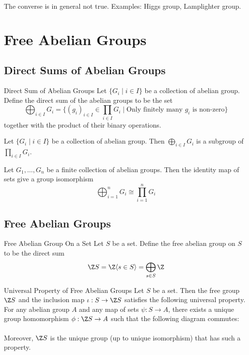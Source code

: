 \documentclass[a4paper]{article}
\begin{document}
The converse is in general not true. Examples: Higgs group, Lamplighter group. 

\pagebreak
\section{Free Abelian Groups}
\subsection{Direct Sums of Abelian Groups}
\begin{defn}{Direct Sum of Abelian Groups}{} Let $\{G_i\;|\;i\in I\}$ be a collection of abelian group. Define the direct sum of the abelian groups to be the set $$\bigoplus_{i\in I}G_i=\{(g_i)_{i\in I}\in\prod_{i\in I}G_i\;|\;\text{Only finitely many }g_i\text{ is non-zero}\}$$ together with the product of their binary operations. 
\end{defn}

\begin{lmm}{}{} Let $\{G_i\;|\;i\in I\}$ be a collection of abelian group. Then $\bigoplus_{i\in I}G_i$ is a subgroup of $\prod_{i\in I}G_i$. 
\end{lmm}

\begin{lmm}{}{} Let $G_1,\dots,G_n$ be a finite collection of abelian groups. Then the identity map of sets give a group isomorphism $$\bigoplus_{i=1}^nG_i\cong\prod_{i=1}^nG_i$$
\end{lmm}

\subsection{Free Abelian Groups}
\begin{defn}{Free Abelian Group On a Set}{} Let $S$ be a set. Define the free abelian group on $S$ to be the direct sum $$\Z S=\Z\langle s\in S\rangle=\bigoplus_{s\in S}\Z$$ 
\end{defn}

\begin{prp}{Universal Property of Free Abelian Groups}{} Let $S$ be a set. Then the free group $\Z S$ and the inclusion map $\iota:S\to\Z S$ satisfies the following universal property. For any abelian group $A$ and any map of sets $\psi:S\to A$, there exists a unique group homomorphism $\phi:\Z S\to A$ such that the following diagram commutes: \\
 \\
Moreover, $\Z S$ is the unique group (up to unique isomorphism) that has such a property. 
\end{prp}
\end{document}
